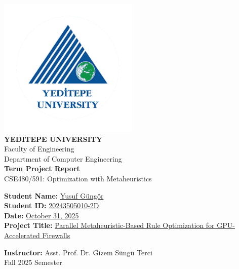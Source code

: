 \documentclass[12pt,a4paper]{article}
\begin{document}
\begin{titlepage}
    \centering
    \includegraphics[width=0.5\textwidth]{yeditepe_logo.png}\\[1cm]  %
    {\Large \textbf{YEDITEPE UNIVERSITY}}\\[4pt]
    {\large Faculty of Engineering}\\[2pt]
    {\large Department of Computer Engineering}\\[2cm]
    {\huge \textbf{Term Project Report}}\\[0.4cm]
    {\Large CSE480/591: Optimization with Metaheuristics}\\[1cm]
    \vfill
    \begin{flushleft}
    \textbf{Student Name:} \underline{Yusuf Güngör}\\[8pt]
    \textbf{Student ID:} \underline{20243505010-2D}\\[8pt]
    \textbf{Date:} \underline{October 31, 2025}\\[8pt]
    \textbf{Project Title:} \underline{Parallel Metaheuristic-Based Rule Optimization for GPU-Accelerated Firewalls}\\[2cm]
    \end{flushleft}
    \vfill
    {\large \textbf{Instructor:} Asst. Prof. Dr. Gizem Süngü Terci}\\[0.3cm]
    {\large Fall 2025 Semester}\\[1cm]
\end{titlepage}

\newpage

\end{document}
